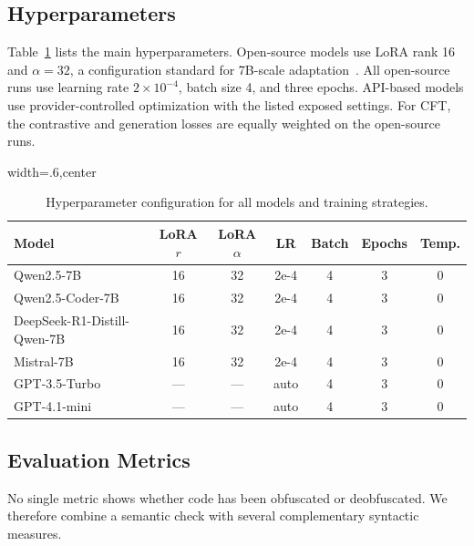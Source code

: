 \subsection{Hyperparameters}
\label{sec:hyperparameters}

Table~\ref{tab:hyperparameters} lists the main hyperparameters. Open-source
models use LoRA rank 16 and $\alpha=32$, a configuration standard for
7B-scale adaptation~\cite{hu2022lora,dettmers2023qlora}. All open-source runs
use learning rate $2\times10^{-4}$, batch size 4, and three epochs. API-based
models use provider-controlled optimization with the listed exposed settings.
For CFT, the contrastive and generation losses are equally weighted on the
open-source runs.

\begin{table}[tb]
\centering
\caption{Hyperparameter configuration for all models and training strategies.}
\label{tab:hyperparameters}
\begin{adjustbox}{width=.6\columnwidth,center}
\begin{tabular}{@{}lcccccc@{}}
\toprule
\textbf{Model} & \textbf{LoRA $r$} & \textbf{LoRA $\alpha$} & \textbf{LR} & \textbf{Batch} & \textbf{Epochs} & \textbf{Temp.} \\ \midrule
Qwen2.5-7B & 16 & 32 & 2e-4 & 4 & 3 & 0 \\
Qwen2.5-Coder-7B & 16 & 32 & 2e-4 & 4 & 3 & 0 \\
DeepSeek-R1-Distill-Qwen-7B & 16 & 32 & 2e-4 & 4 & 3 & 0 \\
Mistral-7B & 16 & 32 & 2e-4 & 4 & 3 & 0 \\
GPT-3.5-Turbo & --- & --- & auto & 4 & 3 & 0 \\
GPT-4.1-mini & --- & --- & auto & 4 & 3 & 0 \\ \bottomrule
\end{tabular}
\end{adjustbox}
\vspace{-0.1cm}
\end{table}

\subsection{Evaluation Metrics}
\label{sec:metrics}

No single metric shows whether code has been obfuscated or deobfuscated.
We therefore combine a semantic check with several complementary syntactic measures.

